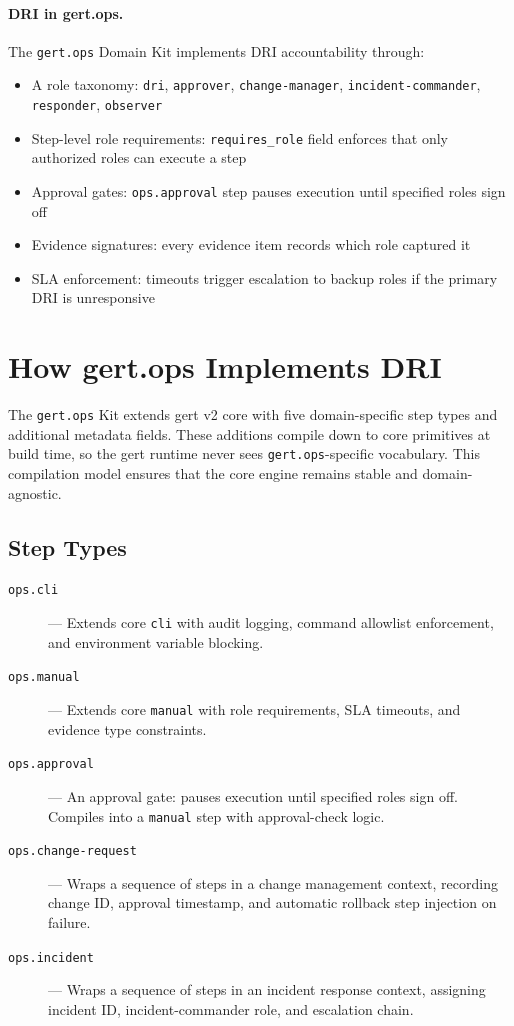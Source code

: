 \paragraph{DRI in gert.ops.}
The \texttt{gert.ops} Domain Kit implements DRI accountability through:
\begin{itemize}
  \item A role taxonomy: \texttt{dri}, \texttt{approver}, \texttt{change-manager}, \texttt{incident-commander}, \texttt{responder}, \texttt{observer}
  \item Step-level role requirements: \texttt{requires\_role} field enforces that only authorized roles can execute a step
  \item Approval gates: \texttt{ops.approval} step pauses execution until specified roles sign off
  \item Evidence signatures: every evidence item records which role captured it
  \item SLA enforcement: timeouts trigger escalation to backup roles if the primary DRI is unresponsive
\end{itemize}

\section{How gert.ops Implements DRI}

The \texttt{gert.ops} Kit extends gert v2 core with five domain-specific step types and additional metadata fields. These additions compile down to core primitives at build time, so the gert runtime never sees \texttt{gert.ops}-specific vocabulary. This compilation model ensures that the core engine remains stable and domain-agnostic.

\subsection{Step Types}

\begin{description}
  \item[\texttt{ops.cli}] — Extends core \texttt{cli} with audit logging, command allowlist enforcement, and environment variable blocking.
  \item[\texttt{ops.manual}] — Extends core \texttt{manual} with role requirements, SLA timeouts, and evidence type constraints.
  \item[\texttt{ops.approval}] — An approval gate: pauses execution until specified roles sign off. Compiles into a \texttt{manual} step with approval-check logic.
  \item[\texttt{ops.change-request}] — Wraps a sequence of steps in a change management context, recording change ID, approval timestamp, and automatic rollback step injection on failure.
  \item[\texttt{ops.incident}] — Wraps a sequence of steps in an incident response context, assigning incident ID, incident-commander role, and escalation chain.
\end{description}

